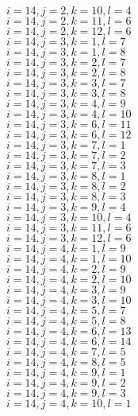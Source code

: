 \documentclass[14pt]{article}
\begin{document}
    $i=14,j=2,k=10,l=4 $ \\ 
    $i=14,j=2,k=11,l=6 $ \\ 
    $i=14,j=2,k=12,l=6 $ \\ 
    $i=14,j=3,k=1,l=7 $ \\ 
    $i=14,j=3,k=1,l=8 $ \\ 
    $i=14,j=3,k=2,l=7 $ \\ 
    $i=14,j=3,k=2,l=8 $ \\ 
    $i=14,j=3,k=3,l=7 $ \\ 
    $i=14,j=3,k=3,l=8 $ \\ 
    $i=14,j=3,k=4,l=9 $ \\ 
    $i=14,j=3,k=4,l=10 $ \\ 
    $i=14,j=3,k=6,l=11 $ \\ 
    $i=14,j=3,k=6,l=12 $ \\ 
    $i=14,j=3,k=7,l=1 $ \\ 
    $i=14,j=3,k=7,l=2 $ \\ 
    $i=14,j=3,k=7,l=3 $ \\ 
    $i=14,j=3,k=8,l=1 $ \\ 
    $i=14,j=3,k=8,l=2 $ \\ 
    $i=14,j=3,k=8,l=3 $ \\ 
    $i=14,j=3,k=9,l=4 $ \\ 
    $i=14,j=3,k=10,l=4 $ \\ 
    $i=14,j=3,k=11,l=6 $ \\ 
    $i=14,j=3,k=12,l=6 $ \\ 
    $i=14,j=4,k=1,l=9 $ \\ 
    $i=14,j=4,k=1,l=10 $ \\ 
    $i=14,j=4,k=2,l=9 $ \\ 
    $i=14,j=4,k=2,l=10 $ \\ 
    $i=14,j=4,k=3,l=9 $ \\ 
    $i=14,j=4,k=3,l=10 $ \\ 
    $i=14,j=4,k=5,l=7 $ \\ 
    $i=14,j=4,k=5,l=8 $ \\ 
    $i=14,j=4,k=6,l=13 $ \\ 
    $i=14,j=4,k=6,l=14 $ \\ 
    $i=14,j=4,k=7,l=5 $ \\ 
    $i=14,j=4,k=8,l=5 $ \\ 
    $i=14,j=4,k=9,l=1 $ \\ 
    $i=14,j=4,k=9,l=2 $ \\ 
    $i=14,j=4,k=9,l=3 $ \\ 
    $i=14,j=4,k=10,l=1 $ \\ 
\end{document}
